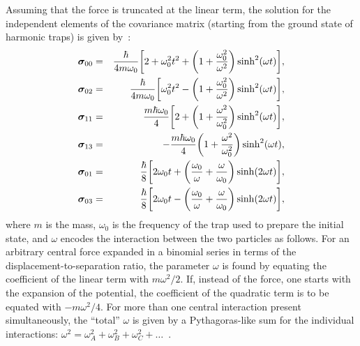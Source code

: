\documentclass[aps,prl,reprint,superscriptaddress,nofootinbib,floatfix]{revtex4-2}
\begin{document}
Assuming that the force is truncated at the linear term,
the solution for the independent elements of the covariance matrix (starting from the ground state of harmonic traps) is given by~\cite{QuantGrav-Ankit2022}:
\begin{eqnarray}
	\bm{\sigma}_{00}  &=& \frac{\hbar}{4m\omega_0} \qty[ 2+\omega_0^2t^2+\qty( 1+\frac{\omega_0^2}{\omega^2} )\sinh^2(\omega t) ],   
\nonumber \\
	\bm{\sigma}_{02}  &=& \frac{\hbar}{4m\omega_0} \qty[ \omega_0^2t^2-\qty(1+\frac{\omega_0^2}{\omega^2})\sinh^2(\omega t) ],
\nonumber \\
	\bm{\sigma}_{11}   &=&  \frac{m\hbar\omega_0}{4} \qty[ 2+\qty( 1+\frac{\omega^2}{\omega_0^2} )\sinh^2(\omega t) ], 
\nonumber \\
	\bm{\sigma}_{13} &=& - \frac{m\hbar\omega_0}{4} \qty( 1+\frac{\omega^2}{\omega_0^2} ) \sinh^2(\omega t), 
\nonumber \\
	\bm{\sigma}_{01} &=& \frac{\hbar}{8} \qty[  2\omega_0 t + \qty( \frac{\omega_0}{\omega}+\frac{\omega}{\omega_0} )\sinh(2\omega t) ],   
\nonumber \\
	\bm{\sigma}_{03} &=& \frac{\hbar}{8} \qty[  2\omega_0 t - \qty( \frac{\omega_0}{\omega}+\frac{\omega}{\omega_0} )\sinh(2\omega t) ],
\end{eqnarray}
where $m$ is the mass, $\omega_0$ is the frequency of the trap used to prepare the initial state, and $\omega$ encodes the interaction between the two particles as follows.
For an arbitrary central force expanded in a binomial series in terms of the displacement-to-separation ratio, the parameter $\omega$ is found by equating the coefficient of the linear term with $m\omega^2/2$.
If, instead of the force, one starts with the expansion of the potential, the coefficient of the quadratic term is to be equated with $-m\omega^2/4$.
For more than one central interaction present simultaneously, the ``total'' $\omega$ is given by a Pythagoras-like sum for the individual interactions: $\omega^2 =  \omega_A^2 + \omega_B^2 + \omega_C^2 +\dots$~\cite{QuantGrav-Ankit2022}.
\end{document}
